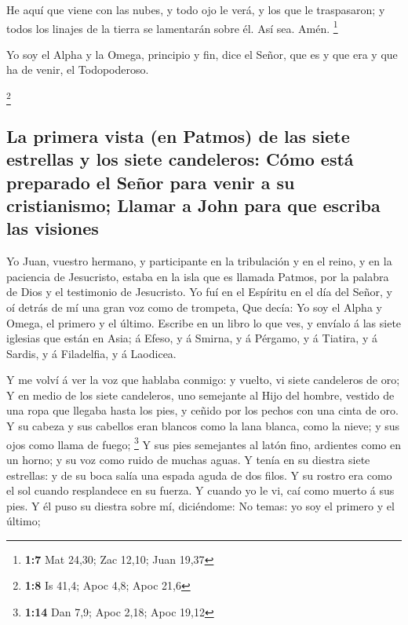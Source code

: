  He aquí que viene con las nubes, y todo ojo le verá, y
los que le traspasaron; y todos los linajes de la tierra se lamentarán
sobre él. Así sea. Amén. \footnote{\textbf{1:7} Mat 24,30; Zac 12,10;
  Juan 19,37}

 Yo soy el Alpha y la Omega, principio y fin, dice el
Señor, que es y que era y que ha de venir, el Todopoderoso.

\footnote{\textbf{1:8} Is 41,4; Apoc 4,8; Apoc 21,6}

\hypertarget{la-primera-vista-en-patmos-de-las-siete-estrellas-y-los-siete-candeleros-cuxf3mo-estuxe1-preparado-el-seuxf1or-para-venir-a-su-cristianismo-llamar-a-john-para-que-escriba-las-visiones}{%
\subsection{La primera vista (en Patmos) de las siete estrellas y los
siete candeleros: Cómo está preparado el Señor para venir a su
cristianismo; Llamar a John para que escriba las
visiones}\label{la-primera-vista-en-patmos-de-las-siete-estrellas-y-los-siete-candeleros-cuxf3mo-estuxe1-preparado-el-seuxf1or-para-venir-a-su-cristianismo-llamar-a-john-para-que-escriba-las-visiones}}

 Yo Juan, vuestro hermano, y participante en la
tribulación y en el reino, y en la paciencia de Jesucristo, estaba en la
isla que es llamada Patmos, por la palabra de Dios y el testimonio de
Jesucristo.  Yo fuí en el Espíritu en el día del Señor, y
oí detrás de mí una gran voz como de trompeta,  Que
decía: Yo soy el Alpha y Omega, el primero y el último. Escribe en un
libro lo que ves, y envíalo á las siete iglesias que están en Asia; á
Efeso, y á Smirna, y á Pérgamo, y á Tiatira, y á Sardis, y á Filadelfia,
y á Laodicea.

 Y me volví á ver la voz que hablaba conmigo: y vuelto,
vi siete candeleros de oro;  Y en medio de los siete
candeleros, uno semejante al Hijo del hombre, vestido de una ropa que
llegaba hasta los pies, y ceñido por los pechos con una cinta de oro.
 Y su cabeza y sus cabellos eran blancos como la lana
blanca, como la nieve; y sus ojos como llama de fuego; \footnote{\textbf{1:14}
  Dan 7,9; Apoc 2,18; Apoc 19,12}  Y sus pies semejantes
al latón fino, ardientes como en un horno; y su voz como ruido de muchas
aguas.  Y tenía en su diestra siete estrellas: y de su
boca salía una espada aguda de dos filos. Y su rostro era como el sol
cuando resplandece en su fuerza.  Y cuando yo le vi, caí
como muerto á sus pies. Y él puso su diestra sobre mí, diciéndome: No
temas: yo soy el primero y el último;

